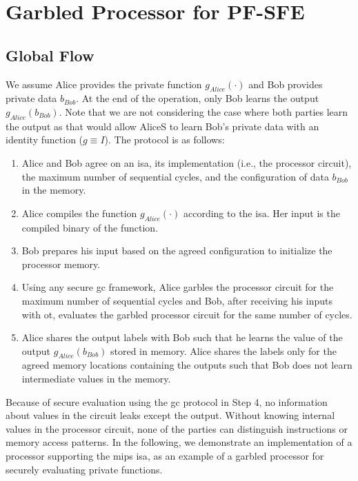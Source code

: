 \section{Garbled Processor for PF-SFE} \label{sec:processor-pro-pfsfe}
\subsection{Global Flow}\label{ssec:processor-mips-flow}
We assume Alice provides the private function $g_{Alice}(\cdot)$ and Bob provides private data $b_{Bob}$.
At the end of the operation, only Bob learns the output $g_{Alice}(b_{Bob})$.
Note that we are not considering the case where both parties learn the output as that would allow AliceS to learn Bob's private data with an identity function ($g\equiv I$).
The protocol is as follows:

\begin{enumerate}
\item
  Alice and Bob agree on an \acrfull{isa}, its implementation (i.e., the processor circuit), the maximum number of sequential cycles, and the configuration of data $b_{Bob}$ in the memory.
\item
  Alice compiles the function $g_{Alice}(\cdot)$ according to the \acrshort{isa}.
  Her input is the compiled binary of the function.
\item
  Bob prepares his input based on the agreed configuration to initialize the processor memory.
\item
  Using any secure \acrshort{gc} framework, Alice garbles the processor circuit for the maximum number of sequential cycles and Bob, after receiving his inputs with \acrshort{ot}, evaluates the garbled processor circuit for the same number of cycles.

\item
  Alice shares the output labels with Bob such that he learns the value of the output $g_{Alice}(b_{Bob})$ stored in memory.
  Alice shares the labels only for the agreed memory locations containing the outputs such that Bob does not learn intermediate values in the memory.
\end{enumerate}

Because of secure evaluation using the \acrshort{gc} protocol in Step 4, no information about values in the circuit leaks except the output.
Without knowing internal values in the processor circuit, none of the parties can distinguish instructions or memory access patterns.
In the following, we demonstrate an implementation of a processor supporting the \gls{mips} \acrshort{isa}, as an example of a garbled processor for securely evaluating private functions.

